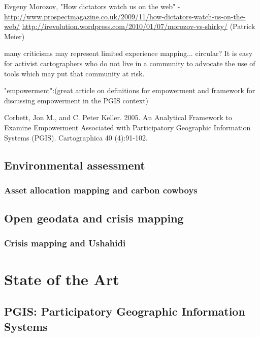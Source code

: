 \documentclass[11pt]{report}
\begin{document}
Evgeny Morozov, "How dictators watch us on the web" - \url{http://www.prospectmagazine.co.uk/2009/11/how-dictators-watch-us-on-the-web/}
\url{http://irevolution.wordpress.com/2010/01/07/morozov-vs-shirky/} (Patrick Meier)

many criticisms may represent limited experience mapping... circular?
It is easy for activist cartographers who do not live in a community to advocate the use of tools which may put that community at risk.

"empowerment":(great article on definitions for empowerment and framework for discussing empowerment in the PGIS context)

Corbett, Jon M., and C. Peter Keller. 2005. An Analytical Framework to Examine Empowerment Associated with Participatory Geographic Information Systems (PGIS). Cartographica 40 (4):91-102.

\section{Environmental assessment}
\subsection{Asset allocation mapping and carbon cowboys}


\section{Open geodata and crisis mapping}
\subsection{Crisis mapping and Ushahidi}

\chapter{State of the Art}
\section{PGIS: Participatory Geographic Information Systems}
\end{document}
